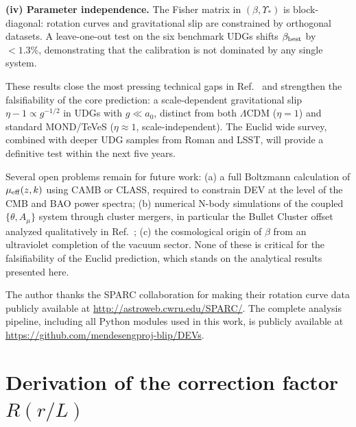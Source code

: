 \documentclass[aps,prd,reprint,floatfix,nofootinbib,superscriptaddress]{revtex4-2}
\newcommand{\aO}{a_0}
\newcommand{\mueff}{\mu_{\rm eff}}
\begin{document}
\textbf{(iv) Parameter independence.} The Fisher matrix in
$(\beta,\Upsilon_*)$ is block-diagonal: rotation curves and
gravitational slip are constrained by orthogonal datasets. A
leave-one-out test on the six benchmark UDGs shifts
$\beta_{\rm best}$ by $<1.3\%$, demonstrating that the calibration
is not dominated by any single system.

These results close the most pressing technical gaps in
Ref.~\cite{Mendes2026} and strengthen the falsifiability of the
core prediction: a scale-dependent gravitational slip
$\eta-1 \propto g^{-1/2}$ in UDGs with $g\ll\aO$, distinct from
both $\Lambda$CDM ($\eta=1$) and standard MOND/TeVeS
($\eta\approx 1$, scale-independent). The Euclid wide survey,
combined with deeper UDG samples from Roman and LSST, will provide
a definitive test within the next five years.

Several open problems remain for future work: (a) a full
Boltzmann calculation of $\mueff(z,k)$ using CAMB or CLASS,
required to constrain DEV at the level of the CMB and BAO
power spectra; (b) numerical N-body simulations of the coupled
$\{\theta,A_\mu\}$ system through cluster mergers, in particular
the Bullet Cluster offset analyzed qualitatively in
Ref.~\cite{Mendes2026}; (c) the cosmological origin of $\beta$
from an ultraviolet completion of the vacuum sector. None of
these is critical for the falsifiability of the Euclid prediction,
which stands on the analytical results presented here.

\begin{acknowledgments}
The author thanks the SPARC collaboration for making their
rotation curve data publicly available at
\url{http://astroweb.cwru.edu/SPARC/}. The complete analysis
pipeline, including all Python modules used in this work, is
publicly available at
\url{https://github.com/mendesengproj-blip/DEVs}.
\end{acknowledgments}

\appendix

\section{Derivation of the correction factor $R(r/L)$}
\label{app:R_derivation}
\end{document}
